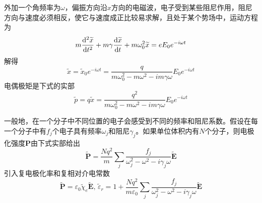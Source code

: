 



外加一个角频率为$\omega$，偏振方向沿$x$方向的电磁波，电子受到某些阻尼作用，阻尼方向与速度必须相反，使它与速度成正比较易求解，且处于某个势场中，运动方程为
\begin{equation}
    m\frac{\dif^2\widetilde{x}}{\dif t^2} + m\gamma\frac{\dif \widetilde{x}}{\dif t} + m\omega_0^2\widetilde{x}= eE_0 e^{-i\omega t}
\end{equation}
解得
\begin{equation}
    \widetilde{x}=\widetilde{x}_0e^{-i\omega t}=\frac{q}{m\omega_0^2-m\omega^2-im\gamma\omega}E_0e^{-i\omega t}
\end{equation}
电偶极矩是下式的实部
\begin{equation}
    \widetilde{p}=q\widetilde{x}=\frac{q^2}{m\omega_0^2-m\omega^2-im\gamma\omega}E_0e^{-i\omega t}
\end{equation}

一般地，在一个分子中不同位置的电子会感受到不同的频率和阻尼系数。假设在每一个分子中有$f_j$个电子具有频率$\omega_j$和阻尼$\gamma_j$。如果单位体积内有$N$个分子，则电极化强度$\boldsymbol{P}$由下式实部给出
\begin{equation}
    \widetilde{\boldsymbol{P}}=\frac{Nq^2}{m}\sum_j\frac{f_j}{\omega_j^2-\omega^2-i\gamma_j\omega}\widetilde{\boldsymbol{E}}
\end{equation}
引入复电极化率和复相对介电常数
\begin{equation}
    \widetilde{\boldsymbol{P}}=\varepsilon_0\widetilde{\chi }_e\widetilde{\boldsymbol{E}},\, \widetilde{\varepsilon}_r=1+\frac{Nq^2}{m\varepsilon_0}\sum_j\frac{f_j}{\omega_j^2-\omega^2-i\gamma_j\omega}\widetilde{\boldsymbol{E}}
\end{equation}


